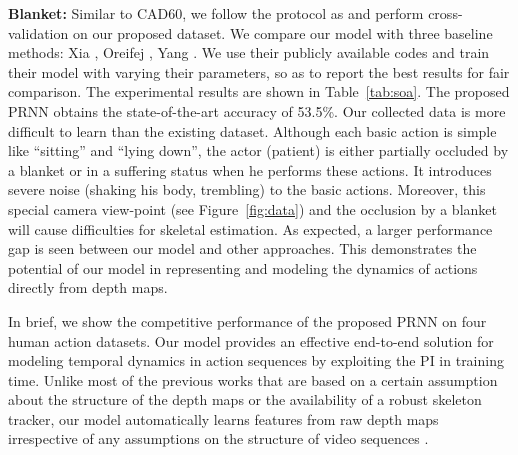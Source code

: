 \documentclass[10pt,twocolumn,letterpaper]{article}
\begin{document}
\noindent \textbf{Blanket:} Similar to CAD60, we follow the protocol as \cite{Jiang_tpami_2014} and perform cross-validation on our proposed dataset. We compare our model with three baseline methods:  Xia \etal \cite{Lu_cvpr_2013}, Oreifej \etal \cite{Omar_cvpr_2013}, Yang \etal \cite{Yang_tpami_2016}. We use their publicly available codes and train their model with varying their parameters, so as to report the best results for fair comparison. The experimental results are shown in Table~\ref{tab:soa}. The proposed PRNN obtains the state-of-the-art accuracy of 53.5\%. Our collected data is more difficult to learn than the existing dataset. Although each basic action is simple like ``sitting'' and ``lying down'', the actor (\ie patient) is either partially occluded by a blanket or in a suffering status when he performs these actions. It introduces severe noise (\eg shaking his body, trembling) to the basic actions. Moreover, this special camera view-point (see Figure~\ref{fig:data}) and the occlusion by a blanket will cause difficulties for skeletal estimation. As expected, a larger performance gap is seen between our model and other approaches. This demonstrates the potential of our model in representing and modeling the dynamics of actions directly from depth maps.

In brief, we show the competitive performance of the proposed PRNN on four human action datasets. Our model provides an effective end-to-end solution for modeling temporal dynamics in action sequences by exploiting the PI in training time. Unlike most of the previous works that are based on a certain assumption about the structure of the depth maps or the availability of a robust skeleton tracker, our model automatically learns features from raw depth maps irrespective of any assumptions \cite{Yu_bmvc_2010,Wong_cvpr_2007} on the structure of video sequences .





\begin{table}[t]
\setlength{\tabcolsep}{0.4em}
\centering
\footnotesize
{}
\caption{Contribution of each model component}
\label{tab:indiv}
\end{table}
\end{document}
